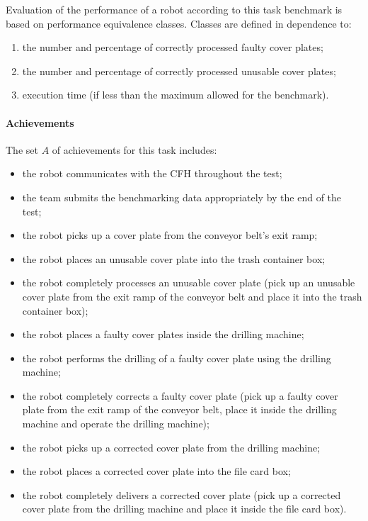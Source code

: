 Evaluation of the performance of a robot according to this task benchmark is based on performance equivalence classes. Classes are defined in dependence to:
\begin{enumerate}
\item the number and percentage of correctly processed faulty cover plates;
\item the number and percentage of correctly processed unusable cover plates;
\item execution time (if less than the maximum allowed for the benchmark).
\end{enumerate}

\noindent 
\paragraph{Achievements} The set $A$ of achievements for this task includes:
\begin{itemize}
\item the robot communicates with the CFH throughout the test;
\item the team submits the benchmarking data appropriately by the end of the test;
\item the robot picks up a cover plate from the conveyor belt's exit ramp;
\item the robot places an unusable cover plate into the trash container box;
\item the robot completely processes an unusable cover plate (pick up an unusable cover plate from the exit ramp of the conveyor belt and place it into the trash container box);
\item the robot places a faulty cover plates inside the drilling machine;
\item the robot performs the drilling of a faulty cover plate using the drilling machine;
\item the robot completely corrects a faulty cover plate (pick up a faulty cover plate from the exit ramp of the conveyor belt, place it inside the drilling machine and operate the drilling machine);
\item the robot picks up a corrected cover plate from the drilling machine;
\item the robot places a corrected cover plate into the file card box;
\item the robot completely delivers a corrected cover plate (pick up a corrected cover plate from the drilling machine and place it inside the file card box).
\end{itemize}

